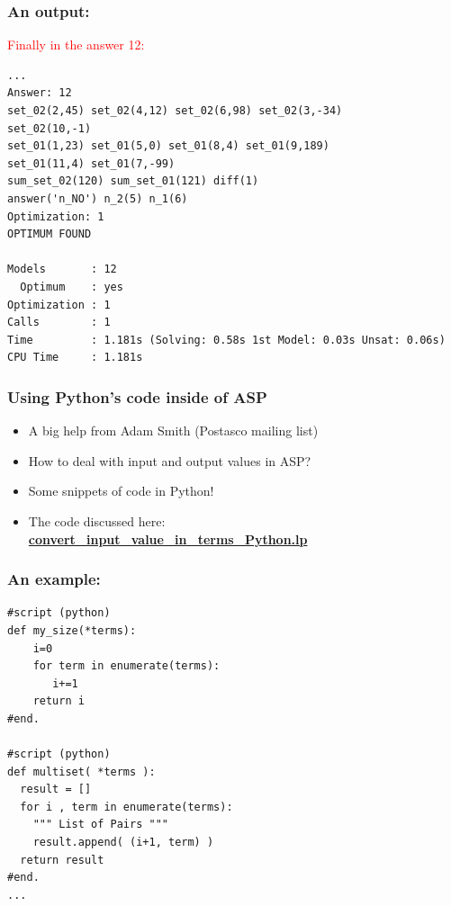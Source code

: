 \documentclass{beamer}
\begin{document}
\begin{frame} [fragile]
\frametitle{An output:}
\textcolor{red}{Finally in the answer 12:}
{\small
\begin{verbatim}
...
Answer: 12    
set_02(2,45) set_02(4,12) set_02(6,98) set_02(3,-34) 
set_02(10,-1) 
set_01(1,23) set_01(5,0) set_01(8,4) set_01(9,189) 
set_01(11,4) set_01(7,-99) 
sum_set_02(120) sum_set_01(121) diff(1) 
answer('n_NO') n_2(5) n_1(6)
Optimization: 1
OPTIMUM FOUND

Models       : 12
  Optimum    : yes
Optimization : 1
Calls        : 1
Time         : 1.181s (Solving: 0.58s 1st Model: 0.03s Unsat: 0.06s)
CPU Time     : 1.181s

\end{verbatim}
}	
\end{frame}

\begin{frame} [fragile]
\frametitle{Using Python's code inside of ASP}

\begin{itemize}
\item A big help from Adam Smith (Postasco mailing list)
\item How to deal with input and output values in ASP?
\pause
\item Some snippets of code in Python!
\item The code discussed here:\\
\textbf{\textcolor{blue}{\url{convert_input_value_in_terms_Python.lp}}}

\end{itemize}
	
\end{frame}

\begin{frame} [fragile]
\frametitle{An example:}
	
{\small
\begin{verbatim}
#script (python)
def my_size(*terms):
    i=0
    for term in enumerate(terms):
       i+=1
    return i
#end.

#script (python)
def multiset( *terms ):
  result = []
  for i , term in enumerate(terms):
    """ List of Pairs """
    result.append( (i+1, term) )
  return result
#end.
...
\end{verbatim}
}	
\end{frame}
\end{document}
